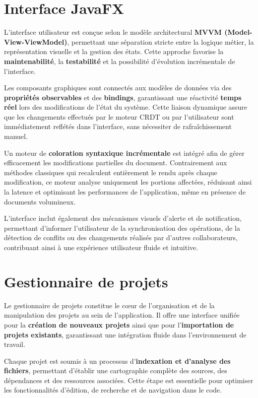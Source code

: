 \documentclass[a4paper,oneside,12pt]{book}
\begin{document}
\section{\textbf{Interface JavaFX}}

L’interface utilisateur est conçue selon le modèle architectural \textbf{MVVM (Model-View-ViewModel)}, permettant une séparation stricte entre la logique métier, la représentation visuelle et la gestion des états. Cette approche favorise la \textbf{maintenabilité}, la \textbf{testabilité} et la possibilité d’évolution incrémentale de l’interface.  

Les composants graphiques sont connectés aux modèles de données via des \textbf{propriétés observables} et des \textbf{bindings}, garantissant une réactivité \textbf{temps réel} lors des modifications de l’état du système. Cette liaison dynamique assure que les changements effectués par le moteur CRDT ou par l’utilisateur sont immédiatement reflétés dans l’interface, sans nécessiter de rafraîchissement manuel.  

Un moteur de \textbf{coloration syntaxique incrémentale} est intégré afin de gérer efficacement les modifications partielles du document. Contrairement aux méthodes classiques qui recalculent entièrement le rendu après chaque modification, ce moteur analyse uniquement les portions affectées, réduisant ainsi la latence et optimisant les performances de l’application, même en présence de documents volumineux.  

L’interface inclut également des mécanismes visuels d’alerte et de notification, permettant d’informer l’utilisateur de la synchronisation des opérations, de la détection de conflits ou des changements réalisés par d’autres collaborateurs, contribuant ainsi à une expérience utilisateur fluide et intuitive.
\section{\textbf{Gestionnaire de projets}}

Le gestionnaire de projets constitue le cœur de l’organisation et de la manipulation des projets au sein de l’application. Il offre une interface unifiée pour la \textbf{création de nouveaux projets} ainsi que pour l’\textbf{importation de projets existants}, garantissant une intégration fluide dans l’environnement de travail.  

Chaque projet est soumis à un processus d’\textbf{indexation et d’analyse des fichiers}, permettant d’établir une cartographie complète des sources, des dépendances et des ressources associées. Cette étape est essentielle pour optimiser les fonctionnalités d’édition, de recherche et de navigation dans le code.  
\end{document}
